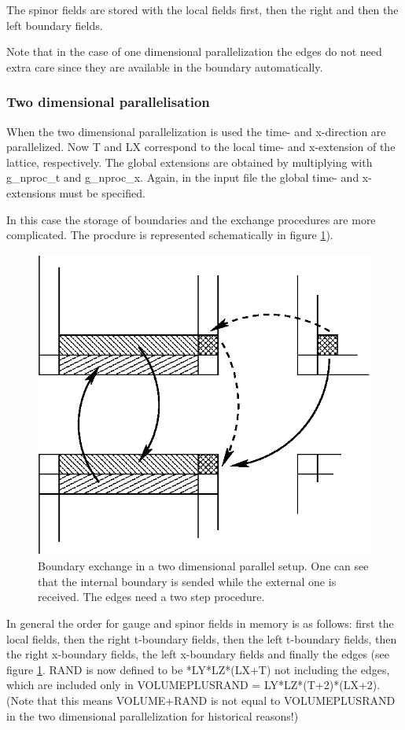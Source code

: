 The spinor fields are stored with the local fields first, then the
right and then the left boundary fields.  

Note that in the case of one dimensional parallelization the edges do
not need extra care since they are available in the boundary
automatically. 

\subsubsection{Two dimensional parallelisation}

When the two dimensional parallelization is used the time- and
x-direction are parallelized. Now {\ttfamily T} and {\ttfamily LX}
correspond to the local time- and x-extension of the lattice,
respectively. The global extensions are obtained by multiplying with
{\ttfamily g\_nproc\_t} and {\ttfamily g\_nproc\_x}. Again, in the
input file the global time- and x-extensions must be specified. 

In this case the storage of boundaries and the exchange procedures are
more complicated. The procdure is represented schematically in figure
\ref{fig:partition}). 

\begin{figure}[htbp]
\centering
\includegraphics[width=0.65\linewidth]{partition}
\caption{Boundary exchange in a two dimensional parallel setup. One
  can see that the internal boundary is sended while the external one
  is received. The edges need a two step procedure.}
\label{fig:partition}
\end{figure}

In general the order for gauge and spinor fields in memory is as
follows: first the local fields, then the right t-boundary fields, then
the left t-boundary fields, then the right x-boundary fields, the left
x-boundary fields and finally the edges (see figure
\ref{fig:partition}. {\ttfamily RAND} is now defined to be {*LY*LZ*(LX+T)} not including the edges, which are included only in
{\ttfamily VOLUMEPLUSRAND = LY*LZ*(T+2)*(LX+2)}. (Note that this means
{\ttfamily VOLUME+RAND} is not equal to {\ttfamily VOLUMEPLUSRAND} in
the two dimensional parallelization for historical reasons!)

